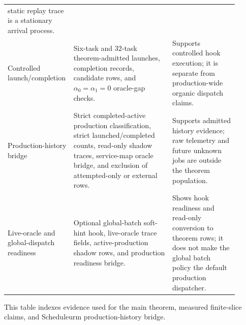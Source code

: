 \documentclass[opre,dblanonrev]{informs4}
\begin{document}
\begin{table}[!htbp]
{\begin{tabular}{>{\raggedright\arraybackslash}p{0.20\linewidth}
                >{\raggedright\arraybackslash}p{0.42\linewidth}
                >{\raggedright\arraybackslash}p{0.28\linewidth}}
static replay trace is a stationary arrival process. \\
Controlled launch/completion & Six-task and 32-task theorem-admitted launches,
completion records, candidate rows, and \(\alpha_0=\alpha_1=0\) oracle-gap
checks. & Supports controlled hook execution; it is separate from production-wide
organic dispatch claims. \\
Production-history bridge & Strict completed-active production classification,
strict launched/completed counts, read-only shadow traces, service-map oracle
bridge, and exclusion of attempted-only or external rows. & Supports admitted
history evidence; raw telemetry and future unknown jobs are outside the theorem
population. \\
Live-oracle and global-dispatch readiness & Optional global-batch soft-hint
hook, live-oracle trace fields, active-production shadow rows, and production
readiness bridge. & Shows hook readiness and read-only conversion to theorem
rows; it does not make the global batch policy the default production
dispatcher. \\
\bottomrule
\end{tabular}
}{This table indexes evidence used for the main theorem, measured finite-slice
claims, and Scheduleurm production-history bridge.}
\end{table}
\end{document}
